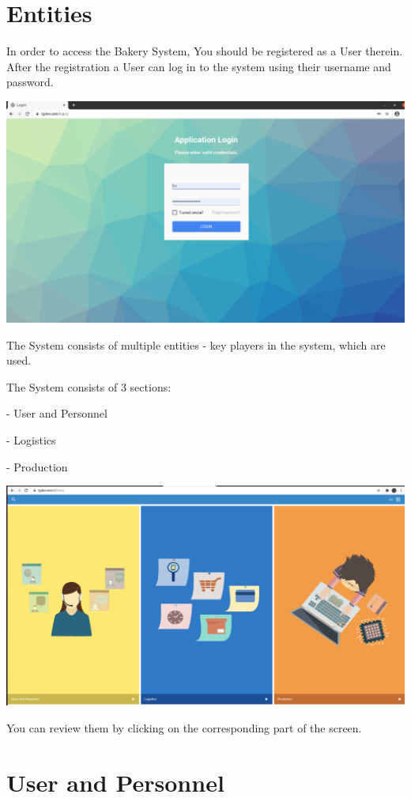 \section{Entities}\label{sec:01}
In order to access the Bakery System, You should be registered as a User therein. 
After the registration a User can log in to the system using their username and password.

\includegraphics[width=\textwidth]{sections/01-chapter/images/login.png}

The System consists of multiple entities - key players in the system, which are used.

The System consists of 3 sections:

- User and Personnel 

- Logistics

- Production

\includegraphics[width=\textwidth]{sections/01-chapter/images/main.png}


You can review them by clicking on the corresponding part of the screen.

\section{User and Personnel}

